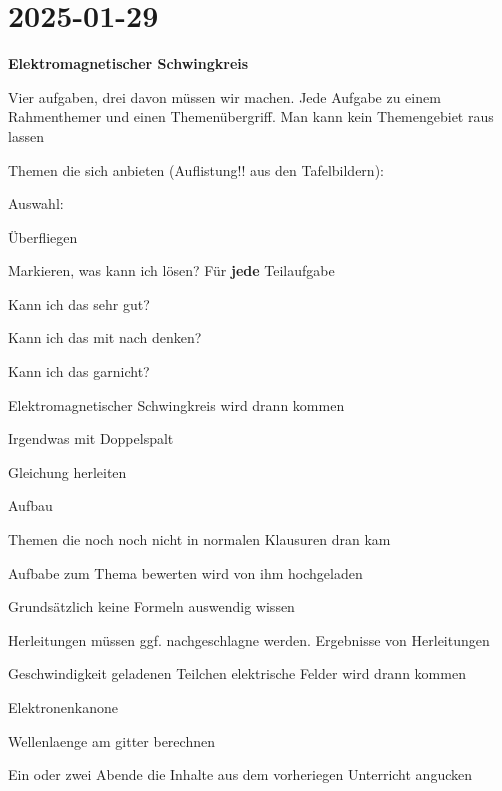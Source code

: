 \section{2025-01-29}

\startframedtipp
{\bf Elektromagnetischer Schwingkreis}
\stopframedtipp

Vier aufgaben, drei davon müssen wir machen. Jede Aufgabe zu einem Rahmenthemer und einen Themenübergriff. Man kann kein Themengebiet raus lassen

Themen die sich anbieten (Auflistung!! aus den Tafelbildern):

Auswahl:

\startitemize[packed,m]
\item Überfliegen
\item Markieren, was kann ich lösen? Für {\bf jede} Teilaufgabe
\startitemize[packed]
\item Kann ich das sehr gut?
\item Kann ich das mit nach denken?
\item Kann ich das garnicht?
\stopitemize
\stopitemize

\startframedtipp
\startitemize[packed]
\item Elektromagnetischer Schwingkreis wird drann kommen
\item Irgendwas mit Doppelspalt
\startitemize[packed]
\item Gleichung herleiten
\item Aufbau
\stopitemize
\item Themen die noch noch nicht in normalen Klausuren dran kam
\item Aufbabe zum Thema bewerten wird von ihm hochgeladen
\item Grundsätzlich keine Formeln auswendig wissen
\item Herleitungen müssen ggf. nachgeschlagne werden. Ergebnisse von Herleitungen 
\item Geschwindigkeit geladenen Teilchen elektrische Felder wird drann kommen
\item Elektronenkanone
\item Wellenlaenge am gitter berechnen
\stopitemize
\stopframedtipp

\startframedtipp
\startitemize[packed,m]
\item Ein oder zwei Abende die Inhalte aus dem vorheriegen Unterricht angucken
\item
\stopitemize
\stopframedtipp

\startframedtipp

